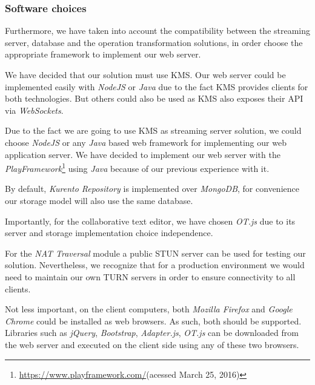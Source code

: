\documentclass[conference,compsoc,a4paper]{IEEEtran}
\begin{document}
\subsubsection{Software choices}

Furthermore, we have taken into account the compatibility between the streaming server, database and the operation transformation solutions, in order choose the appropriate framework to implement our web server.

We have decided that our solution must use \gls{KMS}. Our web server could be implemented easily with \emph{NodeJS} or \emph{Java} due to the fact \gls{KMS} provides clients for both technologies. But others could also be used as \gls{KMS} also exposes their \gls{API} via \emph{WebSockets}.

Due to the fact we are going to use \gls{KMS} as streaming server solution, we could choose \emph{NodeJS} or any \emph{Java} based web framework for implementing our web application server. We have decided to implement our web server with the \emph{PlayFramework}\footnote{\url{https://www.playframework.com/}(acessed March 25, 2016)} using \emph{Java} because of our previous experience with it.

By default, \emph{Kurento Repository} is implemented over \emph{MongoDB}, for convenience our storage model will also use the same database.

Importantly, for the collaborative text editor, we have chosen \emph{OT.js} due to its server and storage implementation choice independence.

For the \emph{NAT Traversal} module a public \gls{STUN} server can be used for testing our solution. Nevertheless, we recognize that for a production environment we would need to maintain our own \gls{TURN} servers in order to ensure connectivity to all clients.

Not less important, on the client computers, both \emph{Mozilla Firefox} and \emph{Google Chrome} could be installed as web browsers. As such, both should be supported. Libraries such as \emph{jQuery}, \emph{Bootstrap}, \emph{Adapter.js}, \emph{OT.js} can be downloaded from the web server and executed on the client side using any of these two browsers.
\end{document}

